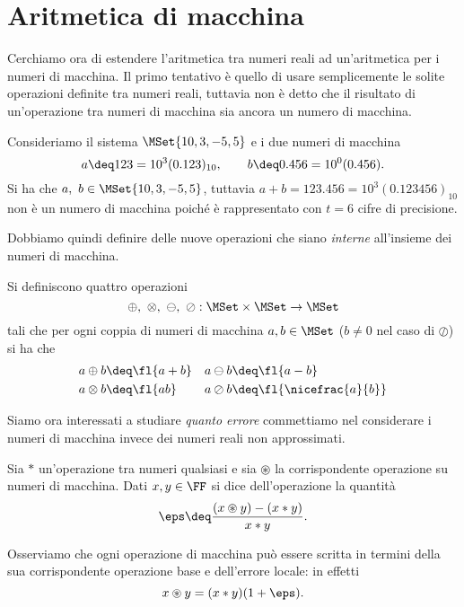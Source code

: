 \section{Aritmetica di macchina}

Cerchiamo ora di estendere l'aritmetica tra numeri reali ad un'aritmetica per i numeri di macchina. Il primo tentativo è quello di usare semplicemente le solite operazioni definite tra numeri reali, tuttavia non è detto che il risultato di un'operazione tra numeri di macchina sia ancora un numero di macchina.

\begin{example}
    Consideriamo il sistema $\MSet{10, 3, -5, 5}$ e i due numeri di macchina \[
        a \deq 123 = 10^3 (0.123)_{10}, \qquad b \deq 0.456 = 10^0 (0.456).
    \] Si ha che $a,\ b \in \MSet{10, 3, -5, 5}$, tuttavia $a + b = 123.456 = 10^3 (0.123456)_{10}$ non è un numero di macchina poiché è rappresentato con $t = 6$ cifre di precisione.
\end{example}

Dobbiamo quindi definire delle nuove operazioni che siano \emph{interne} all'insieme dei numeri di macchina.

\begin{definition}
     Si definiscono quattro operazioni \[
        \oplus,\ \otimes,\ \ominus,\ \oslash : \MSet \times \MSet \to \MSet
    \] tali che per ogni coppia di numeri di macchina $a, b \in \MSet$ ($b \neq 0$ nel caso di $\oslash$) si ha che \begin{align*}
        &a \oplus b \deq \fl{a + b} &&a \ominus b \deq \fl{a - b}\\
        &a \otimes b \deq \fl{ab}   &&a \oslash b \deq \fl{\nicefrac{a}{b}}
    \end{align*}
\end{definition}

Siamo ora interessati a studiare \emph{quanto errore} commettiamo nel considerare i numeri di macchina invece dei numeri reali non approssimati.

\begin{definition}
    Sia $\ast$ un'operazione tra numeri qualsiasi e sia $\circledast$ la corrispondente operazione su numeri di macchina. Dati $x, y \in \FF$ si dice  dell'operazione la quantità \[
        \eps \deq \frac{(x \circledast y) - (x \ast y)}{x \ast y}.
    \]
\end{definition}

Osserviamo che ogni operazione di macchina può essere scritta in termini della sua corrispondente operazione base e dell'errore locale: in effetti \[
    x \circledast y = (x \ast y)(1 + \eps).
\]

